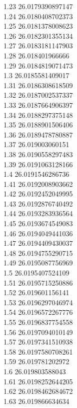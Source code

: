 {1.23	26.0179390897147\\
1.24	26.0180408702373\\
1.25	26.0181378008623\\
1.26	26.0182301355134\\
1.27	26.0183181147903\\
1.28	26.018401966666\\
1.29	26.0184819071473\\
1.3	26.0185581409017\\
1.31	26.0186308618509\\
1.32	26.0187002537337\\
1.33	26.0187664906397\\
1.34	26.0188297375148\\
1.35	26.0188901506406\\
1.36	26.0189478780887\\
1.37	26.019003060151\\
1.38	26.0190558297483\\
1.39	26.0191063128166\\
1.4	26.0191546286736\\
1.41	26.0192008903662\\
1.42	26.0192452049995\\
1.43	26.0192876740492\\
1.44	26.0193283936564\\
1.45	26.0193674549083\\
1.46	26.0194049441036\\
1.47	26.0194409430037\\
1.48	26.0194755290715\\
1.49	26.0195087756969\\
1.5	26.0195407524109\\
1.51	26.0195715250886\\
1.52	26.019601156141\\
1.53	26.0196297046974\\
1.54	26.0196572267776\\
1.55	26.0196837754558\\
1.56	26.0197094010149\\
1.57	26.0197341510938\\
1.58	26.0197580708261\\
1.59	26.019781202972\\
1.6	26.019803588043\\
1.61	26.0198252644205\\
1.62	26.0198462684672\\
1.63	26.019866634634\\
}
